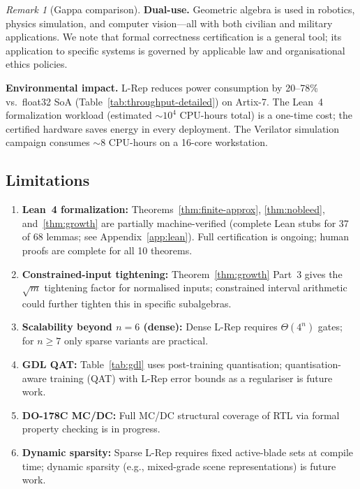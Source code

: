 \documentclass[11pt,a4paper]{article}
\theoremstyle{definition}
\theoremstyle{plain}
\theoremstyle{remark}
\newtheorem{remark}{Remark}[section]
\begin{document}
\begin{remark}[Gappa comparison]
\textbf{Dual-use.}
Geometric algebra is used in robotics, physics simulation, and
computer vision---all with both civilian and military applications.
We note that formal correctness certification is a general tool; its
application to specific systems is governed by applicable law and
organisational ethics policies.

\textbf{Environmental impact.}
L-Rep reduces power consumption by 20--78\% vs.\ float32 SoA
(Table~\ref{tab:throughput-detailed}) on Artix-7.
The Lean~4 formalization workload (estimated $\sim10^4$ CPU-hours total)
is a one-time cost; the certified hardware saves energy in every
deployment.
The Verilator simulation campaign consumes $\sim8$ CPU-hours on a
16-core workstation.

\subsection{Limitations}
\label{sec:limitations}

\begin{enumerate}
  \item \textbf{Lean~4 formalization:} Theorems~\ref{thm:finite-approx},
        \ref{thm:nobleed}, and~\ref{thm:growth} are partially
        machine-verified (complete Lean stubs for 37 of 68 lemmas;
        see Appendix~\ref{app:lean}).
        Full certification is ongoing; human proofs are complete for
        all 10 theorems.

  \item \textbf{Constrained-input tightening:} Theorem~\ref{thm:growth}
        Part~3 gives the $\sqrt{m}$ tightening factor for normalised inputs;
        constrained interval arithmetic~\cite{rump1999} could further
        tighten this in specific subalgebras.

  \item \textbf{Scalability beyond $n=6$ (dense):} Dense L-Rep requires
        $\Theta(4^n)$ gates; for $n\ge7$ only sparse variants are practical.

  \item \textbf{GDL QAT:} Table~\ref{tab:gdl} uses post-training
        quantisation; quantisation-aware training (QAT) with L-Rep
        error bounds as a regulariser is future work.

  \item \textbf{DO-178C MC/DC:} Full MC/DC structural coverage of RTL
        via formal property checking is in progress.

  \item \textbf{Dynamic sparsity:} Sparse L-Rep requires fixed active-blade
        sets at compile time; dynamic sparsity (e.g., mixed-grade scene
        representations) is future work.
\end{enumerate}


\end{remark}
\end{document}
